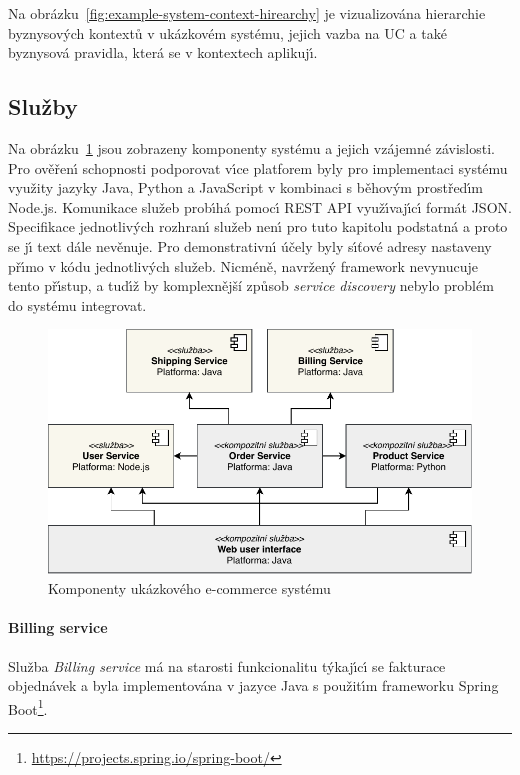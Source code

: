 Na obrázku~\ref{fig:example-system-context-hirearchy} je vizualizována
hierarchie byznysov\'ych kontextů v ukázkovém systému, jejich vazba na \gls{UC}
a také byznysová pravidla, která se v kontextech aplikuj\'{\i}.

\subsection{Služby}

Na obrázku~\ref{fig:example-system} jsou zobrazeny komponenty systému a jejich vzájemné závislosti.
Pro ověřen\'{\i} schopnosti podporovat v\'{\i}ce platforem byly pro implementaci systému využity
jazyky Java, Python a JavaScript v kombinaci s běhov\'ym prostřed\'{\i}m Node.js.
Komunikace služeb prob\'{\i}há pomoc\'{\i} \gls{REST} \gls{API} využ\'{\i}vaj\'{\i}c\'{\i} formát \gls{JSON}.
Specifikace jednotliv\'ych rozhran\'{\i} služeb nen\'{\i} pro tuto kapitolu podstatná a proto se
j\'{\i} text dále nevěnuje. Pro demonstrativn\'{\i} účely byly s\'{\i}ťové adresy nastaveny př\'{\i}mo v kódu jednotliv\'ych
služeb. Nicméně, navržen\'y framework nevynucuje tento př\'{\i}stup, a tud\'{\i}ž by komplexnější
způsob \textit{service discovery} nebylo problém do systému integrovat.

\begin{figure}
    \centering
    \includegraphics[keepaspectratio=true, width=0.8\linewidth]{figures/example-system.pdf}
    \caption{Komponenty ukázkového e-commerce systému}
    \label{fig:example-system}
\end{figure}

\paragraph{Billing service}

Služba \textit{Billing service} má na starosti funkcionalitu t\'ykaj\'{\i}c\'{\i} se fakturace objednávek
a byla implementována v jazyce Java s použit\'{\i}m frameworku Spring Boot\footnote{\url{https://projects.spring.io/spring-boot/}}.

